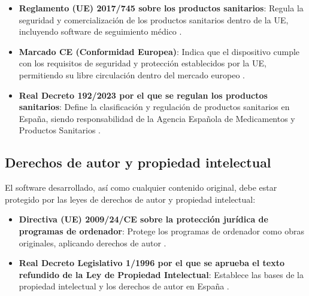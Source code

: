 \begin{itemize}
    \item \textbf{Reglamento (UE) 2017/745 sobre los productos sanitarios}: Regula la seguridad y comercialización de los productos sanitarios dentro de la UE, incluyendo software de seguimiento médico \cite{boe_productos_sanitarios}.
    \item \textbf{Marcado CE (Conformidad Europea)}: Indica que el dispositivo cumple con los requisitos de seguridad y protección establecidos por la UE, permitiendo su libre circulación dentro del mercado europeo \cite{boe_ce}.
    \item \textbf{Real Decreto 192/2023 por el que se regulan los productos sanitarios}: Define la clasificación y regulación de productos sanitarios en España, siendo responsabilidad de la Agencia Española de Medicamentos y Productos Sanitarios \cite{boe_rd}.
\end{itemize}

\subsection{Derechos de autor y propiedad intelectual}

El software desarrollado, así como cualquier contenido original, debe estar protegido por las leyes de derechos de autor y propiedad intelectual:

\begin{itemize}
    \item \textbf{Directiva (UE) 2009/24/CE sobre la protección jurídica de programas de ordenador}: Protege los programas de ordenador como obras originales, aplicando derechos de autor \cite{boe_software}.
    \item \textbf{Real Decreto Legislativo 1/1996 por el que se aprueba el texto refundido de la Ley de Propiedad Intelectual}: Establece las bases de la propiedad intelectual y los derechos de autor en España \cite{boe_propiedad_intelectual}.
\end{itemize}
